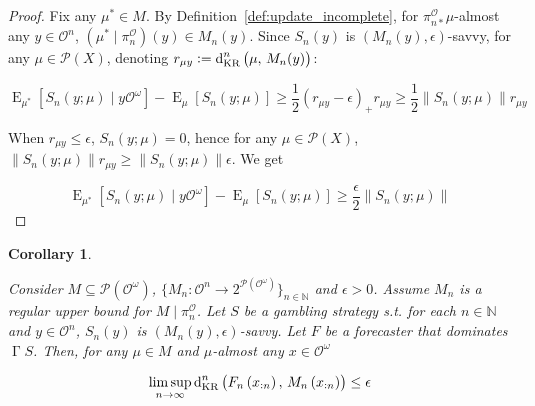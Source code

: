 \documentclass[aop,preprint]{imsart}
\numberwithin{equation}{section}
\theoremstyle{definition}
\theoremstyle{plain}
\newtheorem{corollary}{Corollary}[section]
\newcommand{\Nats}{\mathbb{N}}
\newcommand{\N}[1]{\lVert #1 \rVert}
\newcommand{\Sq}[2]{\{#1\}_{#2 \in \Nats}}
\newcommand{\Sqn}[1]{\Sq{#1}{n}}
\DeclareMathOperator{\E}{E}
\newcommand{\PM}{\mathcal{P}}
\newcommand{\DKR}{\operatorname{d}_{\textnormal{KR}}}
\newcommand{\Ob}{\mathcal{O}}
\newcommand{\OO}{\Ob^\omega}
\newcommand{\PO}{\pi^\Ob}
\newcommand{\PMO}{\PM(\OO)}
\DeclareMathOperator{\PG}{\Gamma}
\begin{document}
\begin{proof}

Fix any $\mu^* \in M$. By Definition~\ref{def:update_incomplete}, for $\PO_{n*}\mu$-almost any $y\in\Ob^n$, ${\left(\mu^* \mid \PO_n\right)\left(y\right) \in M_n(y)}$. Since $S_n\left(y\right)$ is $\left(M_n(y),\epsilon\right)$-savvy, for any $\mu \in \PM\left(X\right)$, denoting $r_{\mu y}:=\DKR^n\left(\mu,\,M_n(y)\right)$:

$$\E_{\mu^*}\left[S_n\left(y;\mu\right) \mid y\OO\right] - \E_{\mu}\left[S_n\left(y;\mu\right)\right] \geq \frac{1}{2} \left(r_{\mu y} - \epsilon\right)_+ r_{\mu y} \geq \frac{1}{2} \N{S_n\left(y;\mu\right)} r_{\mu y}$$

When $r_{\mu y} \leq \epsilon$, $S_n\left(y;\mu\right) = 0$, hence for any $\mu \in \PM\left(X\right)$, $\N{S_n\left(y;\mu\right)} r_{\mu y} \geq \N{S_n\left(y;\mu\right)} \epsilon$. We get

$$\E_{\mu^*}\left[S_n\left(y;\mu\right) \mid y\OO\right] - \E_{\mu}\left[S_n\left(y;\mu\right)\right] \geq \frac{\epsilon}{2} \N{S_n\left(y;\mu\right)}$$
\end{proof}

\begin{samepage}
\begin{corollary}
\label{crl:vicinity_convergence}

Consider $M \subseteq \PMO$, $\Sqn{M_n : \Ob^n \rightarrow 2^{\PMO}}$ and $\epsilon > 0$. Assume $M_n$ is a regular upper bound for $M \mid \PO_n$. Let $S$ be a gambling strategy s.t. for each $n \in \Nats$ and $y \in \Ob^n$, $S_n\left(y\right)$ is $\left(M_n(y),\epsilon\right)$-savvy. Let $F$ be a forecaster that dominates $\PG{S}$. Then, for any $\mu \in M$ and $\mu$-almost any $x \in \OO$

\begin{equation}
\limsup_{n \rightarrow \infty} \DKR^n\left(F_n\left(x_{:n}\right),\, M_n\left(x_{:n}\right)\right) \leq \epsilon
\end{equation}

\end{corollary}
\end{samepage}
\end{document}
